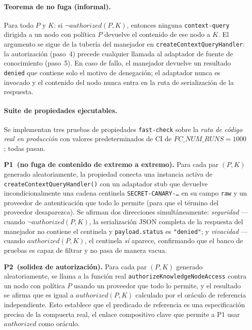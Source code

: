 \documentclass[10pt,twocolumn,letterpaper]{article}
\begin{document}
\paragraph{Teorema de no fuga (informal).}
Para todo $P$ y $K$: si $\neg\mathit{authorized}(P,K)$, entonces ninguna
\texttt{context-query} dirigida a un nodo con política $P$ devuelve el contenido
de ese nodo a $K$. El argumento se sigue de la tubería del manejador en
\texttt{createContextQueryHandler}: la autorización (paso~4) precede cualquier
llamada al adaptador de fuente de conocimiento (paso~5). En caso de fallo, el
manejador devuelve un resultado \texttt{denied} que contiene solo el motivo de
denegación; el adaptador nunca es invocado y el contenido del nodo nunca entra en
la ruta de serialización de la respuesta.

\paragraph{Suite de propiedades ejecutables.}
Se implementan tres pruebas de propiedades \texttt{fast-check} sobre la
\emph{ruta de código real en producción} con valores predeterminados de CI de
$\mathit{FC\_NUM\_RUNS}=1000$; todas pasan.

\textbf{P1~(no fuga de contenido de extremo a extremo).}
Para cada par $(P,K)$ generado aleatoriamente, la propiedad conecta una instancia
activa de \texttt{createContextQueryHandler()} con un adaptador stub que devuelve
incondicionalmente una cadena centinela
\texttt{SECRET-CANARY-\ldots} en su campo \texttt{raw} y un proveedor de
autenticación que todo lo permite (para que el término del proveedor desaparezca).
Se afirman dos direcciones simultáneamente: \emph{seguridad} --- cuando
$\neg\mathit{authorized}(P,K)$, la serialización JSON completa de la respuesta
del manejador no contiene el centinela y \texttt{payload.status} es
\texttt{"denied"}; y \emph{vivacidad} --- cuando $\mathit{authorized}(P,K)$, el
centinela \emph{sí} aparece, confirmando que el banco de pruebas es capaz de
filtrar y no pasa de manera vacua.

\textbf{P2~(solidez de autorización).}
Para cada par $(P,K)$ generado aleatoriamente, se llama a la función real
\texttt{authorizeKnowledgeNodeAccess} contra un nodo con política $P$ usando un
proveedor que todo lo permite, y el resultado se afirma que es igual a
$\mathit{authorized}(P,K)$ calculado por el oráculo de referencia independiente.
Esto establece que el predicado de referencia es una especificación precisa de la
compuerta real, el enlace compositivo clave que permite a P1 usar
$\mathit{authorized}$ como oráculo.
\end{document}
